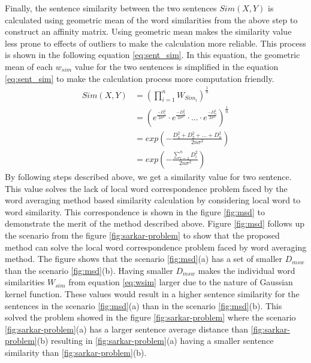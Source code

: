 Finally, the sentence similarity between the two sentences $Sim(X,Y)$ is calculated using geometric mean of the word similarities from the above step to construct an affinity matrix. Using geometric mean makes the similarity value less prone to effects of outliers to make the calculation more reliable. This process is shown in the following equation \ref{eq:sent_sim}. In this equation, the geometric mean of each $w_{sim}$ value for the two sentences is simplified in the equation \ref{eq:sent_sim} to make the calculation process more computation friendly. 
\begin{equation}\label{eq:sent_sim}
    \begin{split}
        Sim(X,Y)
        &=  \left(
                \prod_{i=1}^nW_{Sim_i}
            \right)^{\frac{1}{n}}\\
        &=  \left(
                e^{\frac{-D_1^2}{2\sigma^2}}\cdot
                e^{\frac{-D_2^2}{2\sigma^2}}\cdot
                    \ldots \cdot
                e^{\frac{-D_n^2}{2\sigma^2}}
            \right)^\frac{1}{n}\\
        &=  exp\left(
                -\frac{D_1^2+D_2^2+\ldots+D_n^2}{2n\sigma^2}
            \right)\\
        &=  exp\left(
                -\frac{\sum_{i=1}^nD_i^2}{2n\sigma^2}
            \right)
    \end{split}
\end{equation}
By following steps described above, we get a similarity value for two sentence. This value solves the lack of local word correspondence problem faced by the word averaging method based similarity calculation \cite{roychowdhury-etal-2022-spectral-base} by considering local word to word similarity. This correspondence is shown in the figure \ref{fig:msd} to demonstrate the merit of the method described above. Figure \ref{fig:msd} follows up the scenario from the figure \ref{fig:sarkar-problem} to show that the proposed method can solve the local word correspondence problem faced by word averaging method. The figure shows that the scenario \ref{fig:msd}(a) has a set of smaller $D_{msw}$ than the scenario \ref{fig:msd}(b). Having smaller $D_{msw}$ makes the individual word similarities $W_{sim}$ from equation \ref{eq:wsim} larger due to the nature of Gaussian kernel function. These values would result in a higher sentence similarity for the sentences in the scenario \ref{fig:msd}(a) than in the scenario \ref{fig:msd}(b). This solved the problem showed in the figure \ref{fig:sarkar-problem} where the scenario \ref{fig:sarkar-problem}(a) has a larger sentence average distance than \ref{fig:sarkar-problem}(b) resulting in \ref{fig:sarkar-problem}(a) having a smaller sentence similarity than \ref{fig:sarkar-problem}(b).\\

